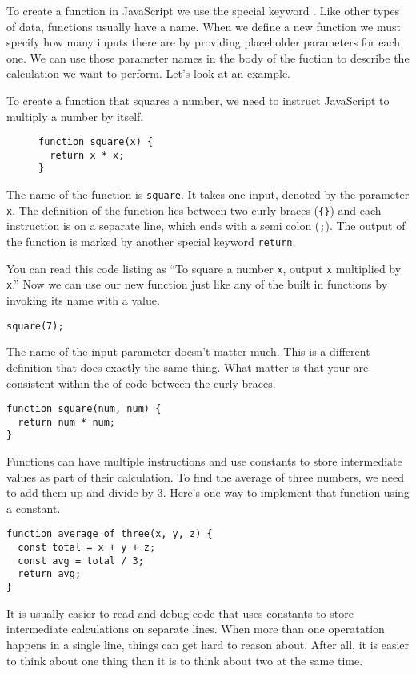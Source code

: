 \documentclass{amsart}
\begin{document}
To create a function in JavaScript we use the special keyword {}. Like other types of data, functions usually have a name. When we define a new function we must specify how many inputs there are by providing placeholder parameters for each one. We can use those parameter names in the body of the fuction to describe the calculation we want to perform. Let's look at an example.

To create a function that squares a number, we need to instruct JavaScript to multiply a number by itself.

\begin{figure}[h]
\begin{lstlisting}
function square(x) {
  return x * x;
}
\end{lstlisting}
\end{figure}

The name of the function is \texttt{square}. It takes one input, denoted by the parameter \texttt{x}. The definition of the function lies between two curly braces (\texttt{\{\}}) and each instruction is on a separate line, which ends with a semi colon (\texttt{;}). The output of the function is marked by another special keyword {\color{cyan}\texttt{return}};

You can read this code listing as ``To square a number \texttt{x}, output \texttt{x} multiplied by \texttt{x}.'' Now we can use our new function just like any of the built in functions by invoking its name with a value.

\begin{lstlisting}
square(7);
\end{lstlisting}

The name of the input parameter doesn't matter much. This is a different definition that does exactly the same thing. What matter is that your are consistent within the  of code between the curly braces.

\begin{lstlisting}
function square(num, num) {
  return num * num;
}
\end{lstlisting}

Functions can have multiple instructions and use constants to store intermediate values as part of their calculation. To find the average of three numbers, we need to add them up and divide by 3. Here's one way to implement that function using a constant.

\begin{lstlisting}
function average_of_three(x, y, z) {
  const total = x + y + z;
  const avg = total / 3;
  return avg;
}
\end{lstlisting}

It is usually easier to read and debug code that uses constants to store intermediate calculations on separate lines. When more than one operatation happens in a single line, things can get hard to reason about. After all, it is easier to think about one thing than it is to think about two at the same time.
\end{document}
